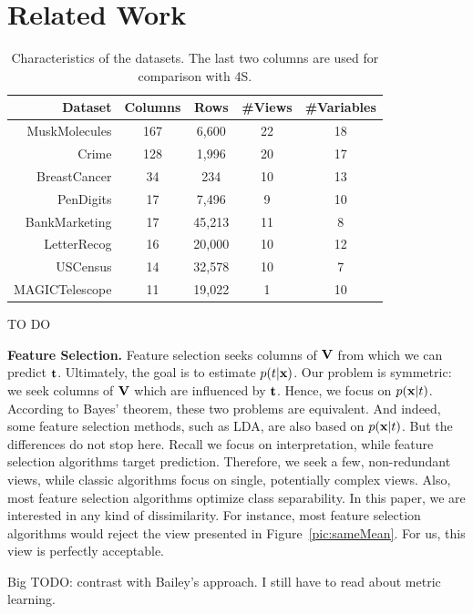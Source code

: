 \section{Related Work}
\label{sec:related-works}
\begin{table}[!t]
    \centering
    \small
    \begin{tabular}{r c c c c} 
        \hline
        Dataset & Columns & Rows & \#Views & \#Variables\\
        \hline
        MuskMolecules & 167 & 6,600 & 22 & 18\\
        Crime & 128 & 1,996 & 20 & 17\\
        BreastCancer & 34 & 234 & 10 & 13\\
        PenDigits & 17 & 7,496 & 9 & 10\\
        BankMarketing & 17 & 45,213 & 11& 8\\
        LetterRecog & 16 & 20,000 & 10 & 12\\
        USCensus & 14 & 32,578 & 10 & 7\\
        MAGICTelescope & 11 & 19,022 & 1 & 10\\
        \hline
    \end{tabular}
    \caption{Characteristics of the datasets. The last two columns are used for
    comparison with 4S.}
    \label{tab:datasets}
\end{table}

{\color{red} TO DO}

\textbf{Feature Selection.} Feature selection seeks columns of $\mathbf{V}$ from
which we can predict $\mathbf{t}$. Ultimately, the goal is to estimate
$p(t|\mathbf{x})$. Our problem is symmetric: we seek columns of $\mathbf{V}$ which are
influenced by $\mathbf{t}$. Hence, we focus on $p(\mathbf{x}|t)$. According to Bayes'
theorem, these two problems are equivalent. And indeed, some feature selection
methods, such as LDA, are also based on $p(\mathbf{x}|t)$. But the differences do
not stop here.  Recall we focus on interpretation, while feature selection
algorithms target prediction. Therefore, we seek a few, non-redundant views,
while classic algorithms focus on single, potentially complex views. Also, most
feature selection algorithms optimize class separability. In this paper, we are
interested in any kind of dissimilarity. For instance, most feature selection
algorithms would reject the view presented in Figure~\ref{pic:sameMean}. For
us, this view is perfectly acceptable. 

{\color{red} Big TODO: contrast with Bailey's approach.
I still have to read about metric learning.}


